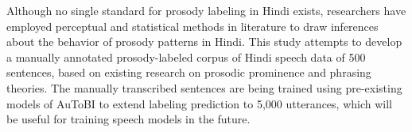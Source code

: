 Although no single standard for prosody labeling in Hindi exists,  researchers have employed perceptual and statistical methods in literature to draw inferences about the behavior of prosody patterns in Hindi.  This study attempts to develop a manually annotated prosody-labeled corpus of Hindi speech data of 500 sentences, based on existing research on prosodic prominence and phrasing theories. The manually transcribed sentences are being trained using pre-existing models of AuToBI to extend labeling prediction to 5,000 utterances, which will be useful for training speech models in the future.
